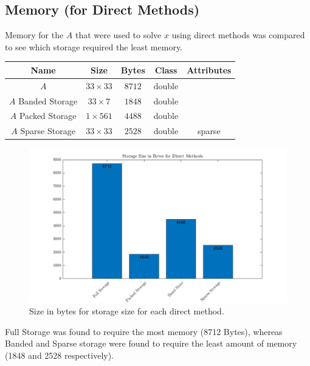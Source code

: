 \documentclass[12pt,a4paper]{article}
\begin{document}
\subsection{Memory (for Direct Methods)}
Memory for the $A$ that were used to solve $x$ using direct methods was compared to see which storage required the least memory.
\begin{center}
\begin{tabular}{c c c c c}
Name & Size & Bytes & Class & Attributes \\
\hline
$A$ & $33 \times 33$ & $8712$ & double & \\
$A$ Banded Storage & $33 \times 7$ & $1848$ & double & \\
$A$ Packed Storage & $1 \times 561$ & $4488$ & double & \\
$A$ Sparse Storage & $33 \times 33$ & $2528$ & double & sparse \\
\end{tabular}
\end{center}
\begin{figure}[H]
	\includegraphics[width=\linewidth]{images/MemoryGraph.png}
	\caption{Size in bytes for storage size for each direct method.}
	\label{fig:memory}
\end{figure}
Full Storage was found to require the most memory (8712 Bytes), whereas Banded and Sparse storage were found to require the least amount of memory (1848 and 2528 respectively). 
\end{document}
